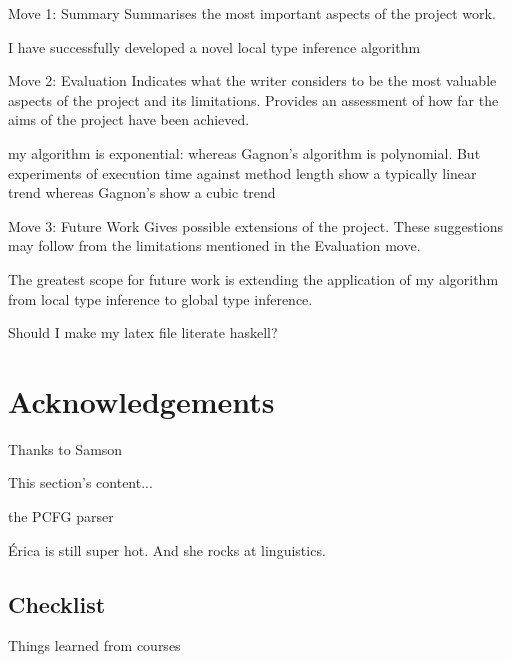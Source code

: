 \documentclass[12pt]{article}
\let\stdsection\section
\renewcommand\section{\newpage\stdsection}
\begin{document}
Move 1: Summary 
Summarises the most important aspects of the project work.  

I have successfully developed a novel local type inference algorithm

Move 2: Evaluation
Indicates what the writer considers to be the most valuable aspects of the project and its limitations. Provides 
an assessment of how far the aims of the project have been achieved.

my algorithm is exponential: whereas Gagnon's algorithm is 
polynomial. But experiments of execution time against method length show a typically linear trend whereas 
Gagnon's show a cubic trend

Move 3: Future Work
Gives possible extensions of the project. These suggestions may follow from the limitations mentioned in the 
Evaluation move. 

The greatest scope for future work is extending the application of my algorithm from local type inference to 
global type inference.

Should I make my latex file literate haskell? %



\section*{Acknowledgements}
Thanks to Samson

This section's content...\cite{visser1999donkey}

the PCFG parser\cite{klein2003accurate}

Érica is still super hot. And she rocks at linguistics.\cite{lander2001initial}

\subsection{Checklist}
Things learned from courses




\end{document}
